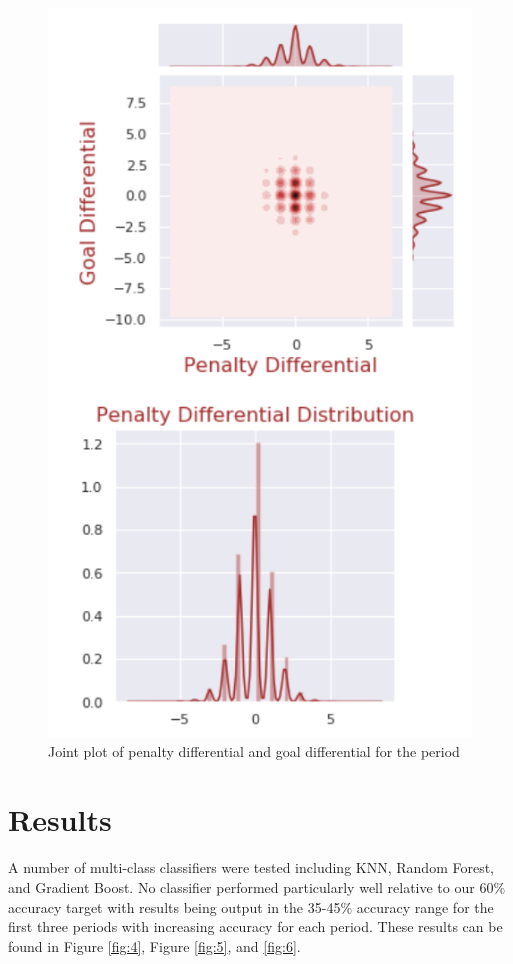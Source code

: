\documentclass[twocolumn,letterpaper,12pt,notitlepage]{article}
\begin{document}
\begin{figure}[htp]
\centering
\includegraphics[width=\linewidth]{joint}
\caption{Joint plot of penalty differential and goal differential for the period}
\label{fig:3}
\end{figure}


\section{Results}
A number of multi-class classifiers were tested including KNN, Random Forest, and Gradient Boost.  No classifier performed particularly well relative to our 60$\%$ accuracy target with results being output in the 35-45$\%$ accuracy range for the first three periods with increasing accuracy for each period. These results can be found in Figure \ref{fig:4}, Figure \ref{fig:5}, and \ref{fig:6}.
\end{document}
